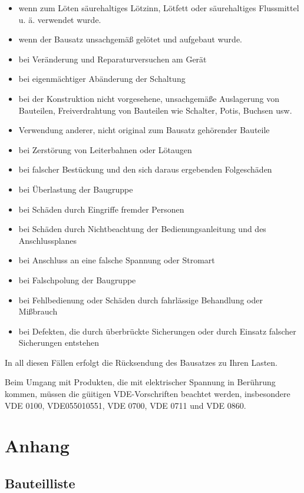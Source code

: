 \documentclass[fleqn,10pt]{SelfArx} %
\begin{document}
\begin{itemize}[noitemsep] %
\item wenn zum Löten säurehaltiges Lötzinn, Lötfett oder säurehaltiges Flussmittel u. ä. verwendet wurde.
\item wenn der Bausatz unsachgemäß gelötet und aufgebaut wurde.
\item bei Veränderung und Reparaturversuchen am Gerät
\item bei eigenmächtiger Abänderung der Schaltung
\item bei der Konstruktion nicht vorgesehene, unsachgemäße Auslagerung von Bauteilen, Freiverdrahtung von Bauteilen wie Schalter, Potis,
Buchsen usw.
\item Verwendung anderer, nicht original zum Bausatz gehörender Bauteile
\item bei Zerstörung von Leiterbahnen oder Lötaugen
\item bei falscher Bestückung und den sich daraus ergebenden Folgeschäden
\item bei Überlastung der Baugruppe
\item bei Schäden durch Eingriffe fremder Personen
\item bei Schäden durch Nichtbeachtung der Bedienungsanleitung und des Anschlussplanes
\item bei Anschluss an eine falsche Spannung oder Stromart
\item bei Falschpolung der Baugruppe
\item bei Fehlbedienung oder Schäden durch fahrlässige Behandlung oder Mißbrauch
\item bei Defekten, die durch überbrückte Sicherungen oder durch Einsatz falscher Sicherungen entstehen
\end{itemize}

In all diesen Fällen erfolgt die Rücksendung des Bausatzes zu Ihren Lasten.

Beim Umgang mit Produkten, die mit elektrischer Spannung in Berührung kommen, müssen die güitigen VDE-Vorschriften beachtet werden, insbesondere VDE 0100, VDE055010551, VDE 0700, VDE 0711
und VDE 0860.


\section{Anhang}

\subsection*{Bauteilliste}
\end{document}
